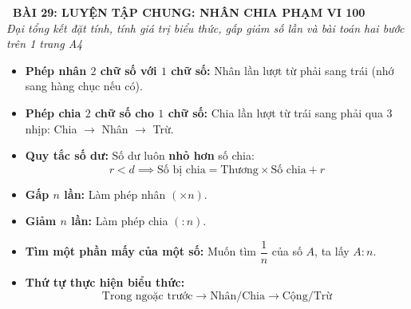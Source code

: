 \documentclass[11pt,a4paper]{article}
\begin{document}
\begin{tcolorbox}[
  enhanced,
  colback=white,
  colframe=primary,
  arc=3mm,
  boxrule=1.2pt,
  left=4mm, right=4mm, top=2.5mm, bottom=2.5mm,
  drop shadow=black!10!white
]
  \centering
  {\Large\bfseries\color{primary}\faBookmark\ BÀI 29: LUYỆN TẬP CHUNG: NHÂN CHIA PHẠM VI 100}\\[1.5mm]
  {\small\itshape\color{black!75}Đại tổng kết đặt tính, tính giá trị biểu thức, gấp giảm số lần và bài toán hai bước trên 1 trang A4}
\end{tcolorbox}

\vspace{-2mm}


\noindent
\begin{minipage}[t]{0.49\textwidth}\vspace{0pt}
\begin{tcolorbox}[
  enhanced,
  colback=blue!4!white,
  colframe=blue!75!black,
  arc=2mm, boxrule=0.8pt,
  left=2mm, right=2mm, top=1.8mm, bottom=1.8mm,
  title={\footnotesize\bfseries\color{white}\faCalculator\ 1. Kĩ thuật tính toán 4 quy tắc}
]
{\footnotesize
\begin{itemize}\setlength{\itemsep}{1.5pt}\setlength{\leftskip}{-2.5mm}
  \item \textbf{Phép nhân $2$ chữ số với $1$ chữ số:}
  Nhân lần lượt từ phải sang trái (nhớ sang hàng chục nếu có).
  \item \textbf{Phép chia $2$ chữ số cho $1$ chữ số:}
  Chia lần lượt từ trái sang phải qua 3 nhịp: Chia $\to$ Nhân $\to$ Trừ.
  \item \textbf{Quy tắc số dư:} Số dư luôn \textbf{nhỏ hơn} số chia:
  $$r < d \implies \text{Số bị chia} = \text{Thương} \times \text{Số chia} + r$$
\end{itemize}
}
\end{tcolorbox}
\end{minipage}
\hfill
\begin{minipage}[t]{0.49\textwidth}\vspace{0pt}
\begin{tcolorbox}[
  enhanced,
  colback=teal!4!white,
  colframe=teal!75!black,
  arc=2mm, boxrule=0.8pt,
  left=2mm, right=2mm, top=1.8mm, bottom=1.8mm,
  title={\footnotesize\bfseries\color{white}\faCheckSquare\ 2. Kĩ năng giải toán tổng hợp}
]
{\footnotesize
\begin{itemize}\setlength{\itemsep}{1.5pt}\setlength{\leftskip}{-2.5mm}
  \item \textbf{Gấp $n$ lần:} Làm phép nhân $(\times n)$.
  \item \textbf{Giảm $n$ lần:} Làm phép chia $(: n)$.
  \item \textbf{Tìm một phần mấy của một số:}
  Muốn tìm $\dfrac{1}{n}$ của số $A$, ta lấy $A : n$.
  \item \textbf{Thứ tự thực hiện biểu thức:}
  $$\text{Trong ngoặc trước} \to \text{Nhân/Chia} \to \text{Cộng/Trừ}$$
\end{itemize}
}
\end{tcolorbox}
\end{minipage}
\end{document}
